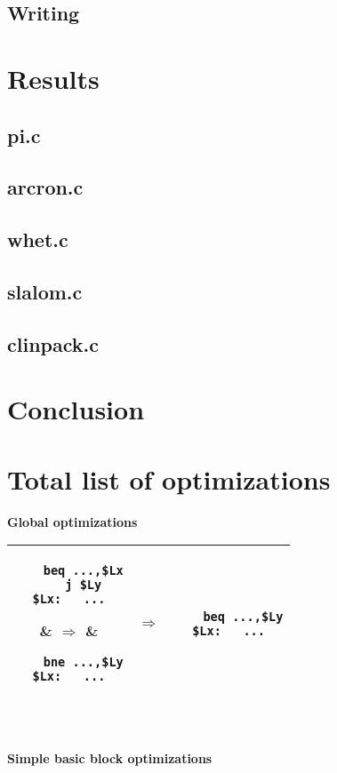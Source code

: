 \documentclass[10pt,a4paper]{article}
\begin{document}
\subsection{Writing}



\section{Results}

\subsection{pi.c}

\subsection{arcron.c}

\subsection{whet.c}

\subsection{slalom.c}

\subsection{clinpack.c}

\section{Conclusion}

\appendix

\section{Total list of optimizations}

\label{opt}

\textbf{Global optimizations}

\begin{tabular}{| c c c |}
\hline
\begin{lstlisting}
    beq ...,$Lx
    j $Ly
$Lx:   ...\end{lstlisting} & $\Rightarrow$ & \begin{lstlisting}
    bne ...,$Ly
$Lx:   ...\end{lstlisting}\\
\hline
\begin{lstlisting}
    bne ...,$Lx
    j $Ly
$Lx:   ...\end{lstlisting} & $\Rightarrow$ & \begin{lstlisting}
    beq ...,$Ly
$Lx:   ...\end{lstlisting}\\
\hline
\end{tabular}\\
\\
\textbf{Simple basic block optimizations}
\end{document}
